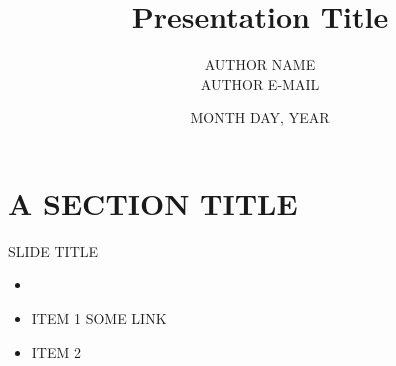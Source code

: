 \documentclass[10pt]{beamer}
\title{Presentation Title}
\date{MONTH DAY, YEAR}
\author{AUTHOR NAME\\
        AUTHOR E-MAIL}
\institute{AUTHOR AFFILIATION}
\begin{document}
\maketitle
\section{A SECTION TITLE}
\begin{frame}[fragile]{SLIDE TITLE}
  \begin{center}
    \begin{itemize}
      \textbf{WPX - WORK PACKAGE TITLE}\item %
      \item ITEM 1
      SOME LINK
      \item ITEM 2
    \end{itemize}
  \end{center}
\end{frame}
\end{document}
